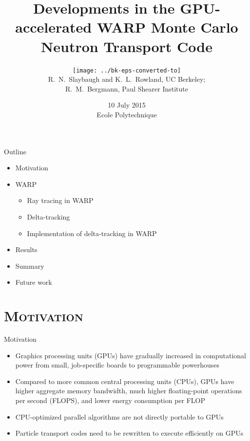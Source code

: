 \documentclass[xcolor=x11names,compress, handout]{beamer}
\renewcommand{\(}{\begin{columns}}
\renewcommand{\)}{\end{columns}}
\newcommand{\<}[1]{\begin{column}{#1}}
\renewcommand{\>}{\end{column}}
\begin{document}
\begin{frame}
\title[Developments in WARP]{Developments in the GPU-accelerated WARP Monte Carlo Neutron Transport Code}
\author{\texttt{[image: ../bk-eps-converted-to]}\\R.\ N.\ Slaybaugh and K.\ L.\ Rowland, UC Berkeley; \\R.\ M.\ Bergmann, Paul Shearer Institute}
\date{10 July 2015 \\ Ecole Polytechnique}
\titlepage
\end{frame}

\begin{frame}[fragile]{Outline}
	\begin{itemize}
	\item{Motivation}
	\item{WARP}
	\begin{itemize}
	    \item{Ray tracing in WARP}
	    \item{Delta-tracking}
	    \item{Implementation of delta-tracking in WARP}
	\end{itemize}
	\item{Results}
	\item{Summary}
	\item{Future work}
	\end{itemize}
\end{frame}


\section{\scshape Motivation}
\begin{frame}{Motivation}
	\begin{itemize}
	\pause
	\item{Graphics processing units (GPUs) have gradually increased in computational power from small,
	job-specific boards to programmable powerhouses}
	\pause
	\item{Compared to more common central processing units (CPUs), GPUs have higher aggregate memory
	bandwidth, much higher floating-point operations per second (FLOPS), and lower energy consumption
	per FLOP \cite{warp2015}}
	\pause
	\item{CPU-optimized parallel algorithms are not directly portable to GPUs}
	\pause
	\item{Particle transport codes need to be rewritten to execute efficiently on GPUs 
	\cite{warp2015}}
	\end{itemize}
\end{frame}
\end{document}
